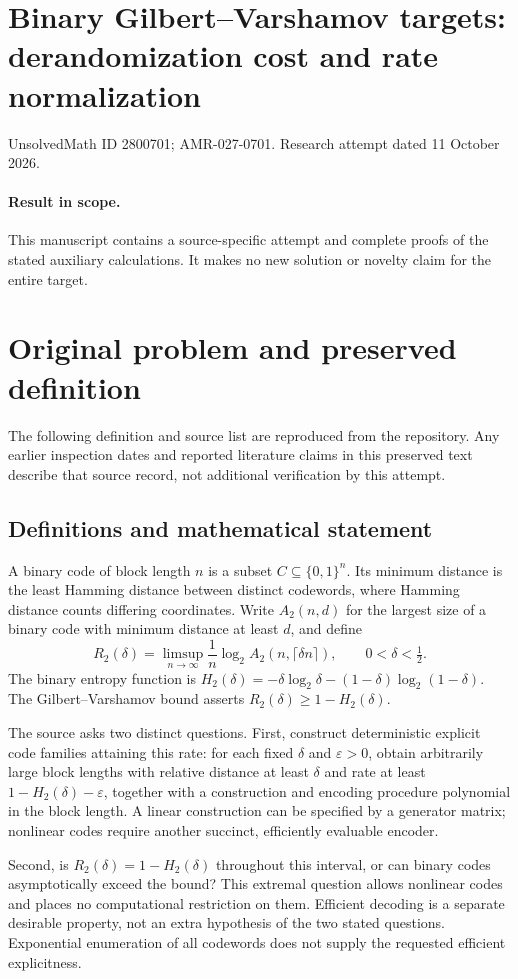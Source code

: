 \documentclass[11pt]{article}
\begin{document}
\section*{Binary Gilbert--Varshamov targets: derandomization cost and rate normalization}
\noindent UnsolvedMath ID 2800701; AMR-027-0701. Research attempt dated 11 October 2026.
\paragraph{Result in scope.}This manuscript contains a source-specific attempt and complete proofs of the stated auxiliary calculations. It makes no new solution or novelty claim for the entire target.
\section{Original problem and preserved definition}
The following definition and source list are reproduced from the repository. Any earlier inspection dates and reported literature claims in this preserved text describe that source record, not additional verification by this attempt.
\subsection{Definitions and mathematical statement}
A binary code of block length $n$ is a subset $C\subseteq\{0,1\}^n$.
Its minimum distance is the least Hamming distance between distinct
codewords, where Hamming distance counts differing coordinates.
Write $A_2(n,d)$ for the largest size of a binary code with minimum
distance at least $d$, and define
\[
 R_2(\delta)=\limsup_{n\to\infty}
            \frac1n\log_2 A_2(n,\lceil\delta n\rceil),
 \qquad 0<\delta<\tfrac12.
\]
The binary entropy function is
$H_2(\delta)=-\delta\log_2\delta-(1-\delta)\log_2(1-\delta)$.
The Gilbert--Varshamov bound asserts $R_2(\delta)\ge1-H_2(\delta)$.

The source asks two distinct questions. First, construct deterministic
explicit code families attaining this rate: for each fixed $\delta$
and $\varepsilon>0$, obtain arbitrarily large block lengths with
relative distance at least $\delta$ and rate at least
$1-H_2(\delta)-\varepsilon$, together with a construction and encoding
procedure polynomial in the block length. A linear construction can
be specified by a generator matrix; nonlinear codes require another
succinct, efficiently evaluable encoder.

Second, is $R_2(\delta)=1-H_2(\delta)$ throughout this interval, or can
binary codes asymptotically exceed the bound? This extremal question
allows nonlinear codes and places no computational restriction on
them. Efficient decoding is a separate desirable property, not an
extra hypothesis of the two stated questions. Exponential enumeration
of all codewords does not supply the requested efficient explicitness.
\end{document}

